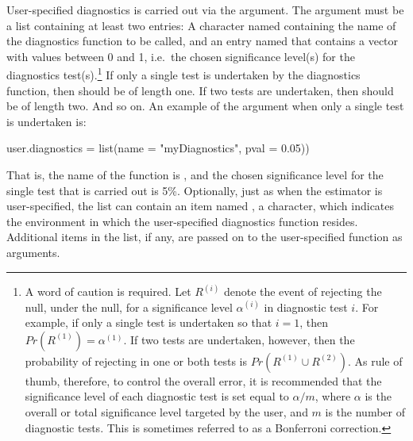 User-specified diagnostics is carried out via the  argument. The argument must be a list containing at least two entries: A character named  containing the name of the diagnostics function to be called, and an entry named  that contains a vector with values between 0 and 1, i.e.\ the chosen significance level(s) for the diagnostics test(s).\footnote{A word of caution is required. Let $R^{\left(i\right)}$ denote the event of rejecting the null, under the null, for a significance level $\alpha^{\left(i\right)}$ in diagnostic test $i$. For example, if only a single test is undertaken so that $i=1$, then $Pr(R^{\left(1\right)}) = \alpha^{\left(1\right)}$. If two tests are undertaken, however, then the probability of rejecting in one or both tests is $Pr\left(R^{\left(1\right)} \cup R^{\left(2\right)}\right)$. As rule of thumb, therefore, to control the overall error, it is recommended that the significance level of each diagnostic test is set equal to $\alpha/m$, where $\alpha$ is the overall or total significance level targeted by the user, and $m$ is the number of diagnostic tests. This is sometimes referred to as a Bonferroni correction.} If only a single test is undertaken by the diagnostics function, then  should be of length one. If two tests are undertaken, then  should be of length two. And so on. An example of the argument when only a single test is undertaken is:
%
\begin{example}
  user.diagnostics = list(name = "myDiagnostics", pval = 0.05))
\end{example}
%
That is, the name of the function is , and the chosen significance level for the single test that is carried out is 5\%. Optionally, just as when the estimator is user-specified, the list can contain an item named , a character, which indicates the environment in which the user-specified diagnostics function resides. Additional items in the list, if any, are passed on to the user-specified function as arguments.

